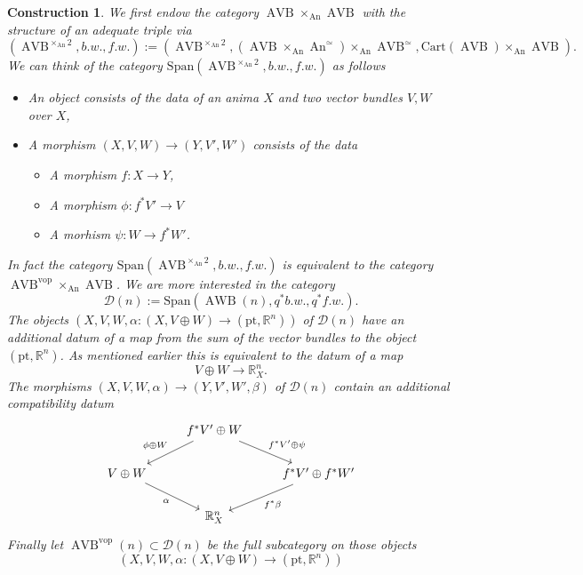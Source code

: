 \documentclass{article}
\newcommand{\R}{\mathbb{R}} %
\newcommand{\cD}{\mathcal{D}}
\newcommand{\pt}{\mathrm{pt}}
\newcommand{\vop}{\mathrm{vop}}
\DeclareMathOperator{\AVB}{AVB}
\DeclareMathOperator{\AWB}{AWB}
\DeclareMathOperator{\An}{An}
\newtheorem{construction}{Construction}
\begin{document}
\begin{construction}
    We first endow the category $\AVB \times_{\An} \AVB$ with the structure of an 
    adequate triple via 
    \small
    \[
      (\AVB^{\times_{\An} 2}, b.w., f.w.) := (
        \AVB^{\times_{\An} 2}, (\AVB \times_{\An} \An^\simeq ) \times_{\An} \AVB^\simeq, 
        \mathrm{Cart}(\AVB) \times_{\An} \AVB) . 
    \]
    \normalsize
    We can think of the category $\mathrm{Span}(\AVB^{\times_{\An} 2}, b.w., f.w.)$
    as follows 
    \begin{itemize}
        \item An object consists of the data of an anima $X$ and two vector bundles $V,W$ 
        over $X$, 
        \item A morphism $(X,V,W) \to (Y,V',W')$ consists of the data
        \begin{itemize}
            \item A morphism $f \colon X \to Y$, 
            \item A morphism $\phi \colon f^*V' \to V$
            \item A morhism $\psi \colon W \to f^*W'$.
        \end{itemize}
    \end{itemize}
    In fact the category $\mathrm{Span}(\AVB^{\times_{\An} 2}, b.w., f.w.)$ is equivalent to 
    the category $\AVB^{\vop}\times_{\An}\AVB$. 
    We are more interested in the category 
    \[ 
        \cD(n) := \mathrm{Span}(\AWB(n), q^*b.w., q^*f.w.).
    \]
    The objects $(X,V, W, \alpha \colon (X, V \oplus W) \to (\pt, \R^n))$ of $\cD(n)$ have an 
    additional datum of a map from the sum of the vector bundles to the object $(\pt, \R^n)$.
    As mentioned earlier this is equivalent to the datum of a map 
    \[
    V \oplus W \to \R^n_X .  
    \]
    The morphisms $(X, V, W, \alpha) \to (Y, V', W', \beta)$ of $\cD(n)$ contain an additional 
    compatibility datum 
    \[\begin{tikzcd}
        & {f^*V' \oplus W} \\
        {V\oplus W} && {f^*V' \oplus f^*W'} \\
        & {\R^n_X}
        \arrow["{\phi \oplus W}"', from=1-2, to=2-1]
        \arrow["{f^*V' \oplus\psi}", from=1-2, to=2-3]
        \arrow["\alpha"', from=2-1, to=3-2]
        \arrow["{f^*\beta}", from=2-3, to=3-2]
    \end{tikzcd}\]
    Finally let $\AVB^\vop(n) \subset \cD(n)$ be the full subcategory on those objects 
    \[
        (X,V,W,\alpha \colon (X, V \oplus W) \to (\pt, \R^n))  
\]
\end{construction}
\end{document}
